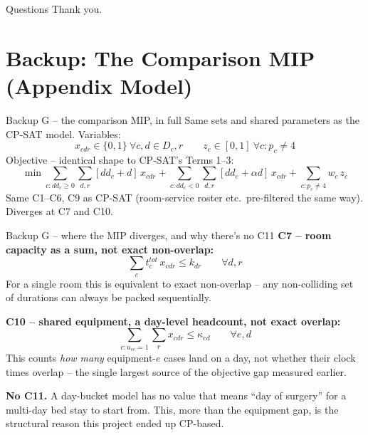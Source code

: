 \documentclass[aspectratio=169]{beamer}
\newcommand{\backbutton}{%
  \hfill\hyperlink{toc}{\beamerreturnbutton{Agenda}}%
}
\begin{document}
\begin{frame}{Questions}
  \centering
  \Large Thank you.
  \vspace{1em}

  \normalsize
  \hyperlink{toc}{}
  \quad
  \hyperlink{backupG}{}
\end{frame}

\appendix
\section{Backup: The Comparison MIP (Appendix Model)}

\begin{frame}{Backup G -- the comparison MIP, in full}
  \hypertarget{backupG}{}
  Same sets and shared parameters as the CP-SAT model. Variables:
  \[
    x_{cdr}\in\{0,1\}\ \forall c,d\in D_c,r \qquad z_c\in[0,1]\ \forall c:p_c\ne4
  \]
  Objective -- identical shape to CP-SAT's Terms 1--3:
  \[
    \min \sum_{c:dd_c\ge0}\sum_{d,r}[dd_c+d]\,x_{cdr}
    + \sum_{c:dd_c<0}\sum_{d,r}[dd_c+\alpha d]\,x_{cdr}
    + \sum_{c:p_c\ne4} w_c\,z_c
  \]
  Same C1--C6, C9 as CP-SAT (room-service roster etc.\ pre-filtered the
  same way). Diverges at C7 and C10.
  \backbutton
\end{frame}

\begin{frame}{Backup G -- where the MIP diverges, and why there's no C11}
  \textbf{C7 -- room capacity as a sum, not exact non-overlap:}
  \[
    \sum_c t_c^{tot}\,x_{cdr}\le k_{dr} \qquad \forall d,r
  \]
  For a single room this is equivalent to exact non-overlap -- any
  non-colliding set of durations can always be packed sequentially.

  \textbf{C10 -- shared equipment, a day-level headcount, not exact
  overlap:}
  \[
    \sum_{c:u_{ce}=1}\sum_r x_{cdr}\le\kappa_{ed} \qquad \forall e,d
  \]
  This counts \emph{how many} equipment-$e$ cases land on a day, not
  whether their clock times overlap -- the single largest source of the
  objective gap measured earlier.

  \textbf{No C11.} A day-bucket model has no value that means ``day of
  surgery'' for a multi-day bed stay to start from. This, more than the
  equipment gap, is the structural reason this project ended up CP-based.
  \backbutton
\end{frame}
\end{document}
